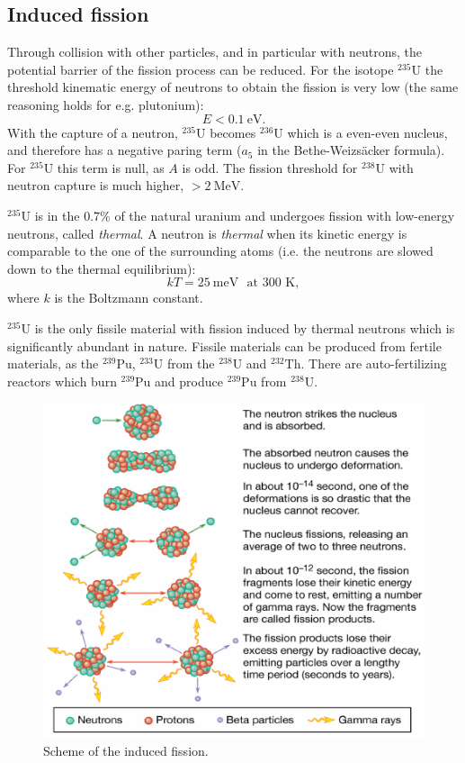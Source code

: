 \subsection{Induced fission}
Through collision with other particles, and in particular with neutrons, the potential barrier of the fission process can be reduced. For the isotope $^{235}\mbox{U}$ the threshold kinematic energy of neutrons to obtain the fission is very low (the same reasoning holds for e.g. plutonium):
\begin{equation*}
    E < 0.1 ~\mbox{eV}.
\end{equation*}
With the capture of a neutron, $^{235}\mbox{U}$ becomes $^{236}\mbox{U}$ which is a even-even nucleus, and therefore has a negative paring term ($a_5$ in the Bethe-Weizs\"acker formula). For  $^{235}\mbox{U}$ this term is null, as \(A\) is odd. The fission threshold for  $^{238}\mbox{U}$ with neutron capture is much  higher, $> 2 ~\mbox{MeV}$.

$^{235}\mbox{U}$ is in the 0.7\% of the natural uranium and undergoes fission with low-energy neutrons, called \emph{thermal}. A neutron is \emph{thermal} when its kinetic energy is comparable to the one of the surrounding atoms (i.e. the neutrons are slowed down to the thermal equilibrium):
\begin{equation*}
    kT = 25 ~\mbox{meV}\,\,\,\,\mbox{at 300 K},
\end{equation*}
where \(k\) is the Boltzmann constant.

$^{235}\mbox{U}$ is the only fissile material with fission induced by thermal neutrons which is significantly abundant in nature. Fissile materials can be produced from fertile materials, as the $^{239}\mbox{Pu}$, $^{233}\mbox{U}$ from the $^{238}\mbox{U}$ and $^{232}\mbox{Th}$. There are auto-fertilizing reactors which burn $^{239}\mbox{Pu}$ and produce $^{239}\mbox{Pu}$ from $^{238}\mbox{U}$.

\begin{figure}[h!]
    \centering
    \includegraphics[width=1\textwidth]{Figures/nuclear-physics3-fig4.pdf}
    \caption{Scheme of the induced fission.}
    \label{fig:nuclear-physics3-fig4}
\end{figure}

